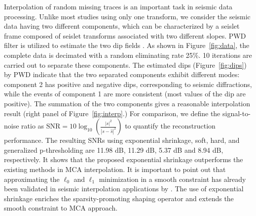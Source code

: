 Interpolation of random missing traces is an important task in seismic data processing. Unlike most studies using only one transform, we consider the seismic data having two different components, which can be characterized by a seislet frame composed of seislet transforms associated with two different slopes. PWD filter is utilized to estimate the two dip fields \citep{fomel2002applications}. As shown in Figure~\ref{fig:data}, the complete data is decimated with a random eliminating rate 25\%. 10 iterations are carried out to separate these components. The estimated dips (Figure~\ref{fig:dips}) by PWD  indicate that the two separated components exhibit different modes: component 2 has positive and negative dips, corresponding to seismic diffractions, while the events of component 1 are more consistent (most values of the dip are positive). The summation of the two components gives a reasonable interpolation result (right panel of Figure~\ref{fig:interp}.) For comparison, we define the signal-to-noise ratio as $\mathrm{SNR}=10\log_{10}(\frac{|s|^2}{|s-\hat{s}|^2})$ to quantify the reconstruction performance. The resulting SNRs using exponential shrinkage, soft, hard, and generalized p-thresholding are 11.98 dB, 11.29 dB, 5.37 dB and 8.94 dB, respectively. It shows that the proposed exponential shrinkage outperforms the existing methods in MCA interpolation. It is important to point out that approximating the $\ell_0$ and $\ell_1$ minimization in a smooth constraint has already been validated in seismic interpolation applications by \cite{cao2011review}. The use of exponential shrinkage enriches the sparsity-promoting shaping operator and extends the smooth constraint to MCA approach.







